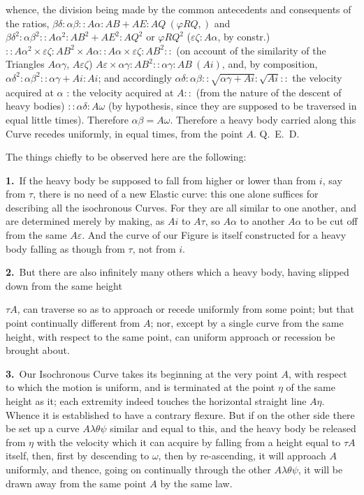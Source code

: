 \documentclass{article}
\begin{document}
whence, the division being made by the common antecedents and consequents of the ratios,
$\beta\delta : \alpha\beta :: A\alpha : AB + AE : AQ\ (\varphi RQ,)$ and
$\beta\delta^{2} : \alpha\beta^{2} :: A\alpha^{2} : AB^{2} + AE^{2} : AQ^{2}$ or $\varphi RQ^{2}$
($\varepsilon\zeta : A\alpha$, by constr.)
$:: A\alpha^{2} \times \varepsilon\zeta : AB^{2} \times A\alpha ::
A\alpha \times \varepsilon\zeta : AB^{2} ::{}$ (on account of the similarity of the Triangles
$A\alpha\gamma$, $A\varepsilon\zeta$) $A\varepsilon \times \alpha\gamma : AB^{2} :: \alpha\gamma : AB\ (Ai)$,
and, by composition, $\alpha\delta^{2} : \alpha\beta^{2} :: \alpha\gamma + Ai : Ai$; and accordingly
$\alpha\delta : \alpha\beta :: \sqrt{\alpha\gamma + Ai} : \sqrt{Ai} ::{}$ the velocity acquired at
$\alpha$ : the velocity acquired at $A ::{}$ (from the nature of the descent of heavy bodies)
$:: \alpha\delta : A\omega$ (by hypothesis, since they are supposed to be traversed in equal little
times). Therefore $\alpha\beta = A\omega$. Therefore a heavy body carried along this Curve recedes
uniformly, in equal times, from the point $A$. Q.~E.~D.

The things chiefly to be observed here are the following:

\textbf{1.}~If the heavy body be supposed to fall from higher or lower than from $i$, say from
$\tau$, there is no need of a new Elastic curve: this one alone suffices for describing all the
isochronous Curves. For they are all similar to one another, and are determined merely by making, as
$Ai$ to $A\tau$, so $A\alpha$ to another $A\alpha$ to be cut off from the same $A\varepsilon$. And
the curve of our Figure is itself constructed for a heavy body falling as though from $\tau$, not
from $i$.

\textbf{2.}~But there are also infinitely many others which a heavy body, having slipped down from
the same height

$\tau A$, can traverse so as to approach or recede uniformly from some point; but that point
continually different from $A$; nor, except by a single curve from the same height, with respect to
the same point, can uniform approach or recession be brought about.

\textbf{3.}~Our Isochronous Curve takes its beginning at the very point $A$, with respect to which
the motion is uniform, and is terminated at the point $\eta$ of the same height as it; each extremity
indeed touches the horizontal straight line $A\eta$. Whence it is established to have a contrary
flexure. But if on the other side there be set up a curve $A\lambda\theta\psi$ similar and
equal to this, and the heavy body be released from $\eta$ with the velocity which it can acquire by
falling from a height equal to $\tau A$ itself, then, first by descending to $\omega$, then by
re-ascending, it will approach $A$ uniformly, and thence, going on continually through the other
$A\lambda\theta\psi$, it will be drawn away from the same point $A$ by the same law.
\end{document}
